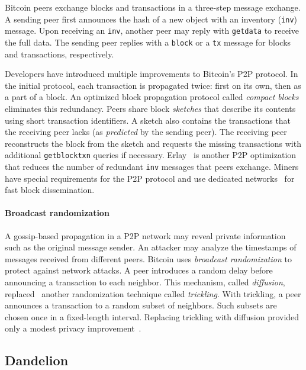 Bitcoin peers exchange blocks and transactions in a three-step message exchange.
A sending peer first announces the hash of a new object with an inventory (\texttt{inv}) message.
Upon receiving an \texttt{inv}, another peer may reply with \texttt{getdata} to receive the full data.
The sending peer replies with a \texttt{block} or a \texttt{tx} message for blocks and transactions, respectively.

Developers have introduced multiple improvements to Bitcoin's P2P protocol.
In the initial protocol, each transaction is propagated twice: first on its own, then as a part of a block.
An optimized block propagation protocol called \textit{compact blocks}~\cite{Core2016} eliminates this redundancy.
Peers share block \textit{sketches} that describe its contents using short transaction identifiers.
A sketch also contains the transactions that the receiving peer lacks (as \textit{predicted} by the sending peer).
The receiving peer reconstructs the block from the sketch and requests the missing transactions with additional \texttt{getblocktxn} queries if necessary.
Erlay~\cite{Naumenko2019} is another P2P optimization that reduces the number of redundant \texttt{inv} messages that peers exchange.
Miners have special requirements for the P2P protocol and use dedicated networks~\cite{FALCON, FIBRE} for fast block dissemination.


\paragraph{Broadcast randomization}

A gossip-based propagation in a P2P network may reveal private information such as the original message sender.
An attacker may analyze the timestamps of messages received from different peers.
Bitcoin uses \textit{broadcast randomization} to protect against network attacks.
A peer introduces a random delay before announcing a transaction to each neighbor.
This mechanism, called \textit{diffusion}, replaced~\cite{Wuille} another randomization technique called \textit{trickling}.
With trickling, a peer announces a transaction to a random subset of neighbors.
Such subsets are chosen once in a fixed-length interval.
Replacing trickling with diffusion provided only a modest privacy improvement~\cite{Fanti2017}.


\subsection{Dandelion}
\label{sec:Dandelion}

